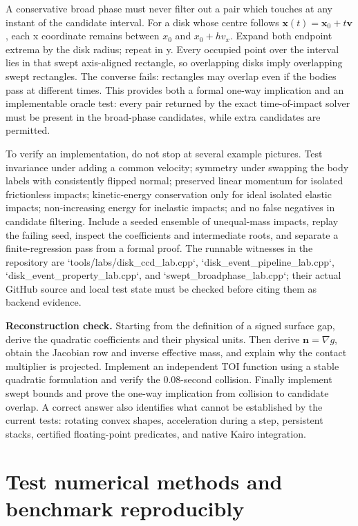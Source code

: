 A conservative broad phase must never filter out a pair which touches at any instant of the candidate interval. For a disk whose centre follows \(\mathbf x(t)=\mathbf x_0+t\mathbf v\), each x coordinate remains between \(x_0\) and \(x_0+hv_x\). Expand both endpoint extrema by the disk radius; repeat in y. Every occupied point over the interval lies in that swept axis-aligned rectangle, so overlapping disks imply overlapping swept rectangles. The converse fails: rectangles may overlap even if the bodies pass at different times. This provides both a formal one-way implication and an implementable oracle test: every pair returned by the exact time-of-impact solver must be present in the broad-phase candidates, while extra candidates are permitted.

To verify an implementation, do not stop at several example pictures. Test invariance under adding a common velocity; symmetry under swapping the body labels with consistently flipped normal; preserved linear momentum for isolated frictionless impacts; kinetic-energy conservation only for ideal isolated elastic impacts; non-increasing energy for inelastic impacts; and no false negatives in candidate filtering. Include a seeded ensemble of unequal-mass impacts, replay the failing seed, inspect the coefficients and intermediate roots, and separate a finite-regression pass from a formal proof. The runnable witnesses in the repository are `tools/labs/disk\_ccd\_lab.cpp`, `disk\_event\_pipeline\_lab.cpp`, `disk\_event\_property\_lab.cpp`, and `swept\_broadphase\_lab.cpp`; their actual GitHub source and local test state must be checked before citing them as backend evidence.

\textbf{Reconstruction check.} Starting from the definition of a signed surface gap, derive the quadratic coefficients and their physical units. Then derive \(\mathbf n=\nabla g\), obtain the Jacobian row and inverse effective mass, and explain why the contact multiplier is projected. Implement an independent TOI function using a stable quadratic formulation and verify the 0.08-second collision. Finally implement swept bounds and prove the one-way implication from collision to candidate overlap. A correct answer also identifies what cannot be established by the current tests: rotating convex shapes, acceleration during a step, persistent stacks, certified floating-point predicates, and native Kairo integration.

\section{Test numerical methods and benchmark reproducibly}\label{02-foundations-ii-ch031-test-numerical-methods-and-benchmark-reproducibly}

